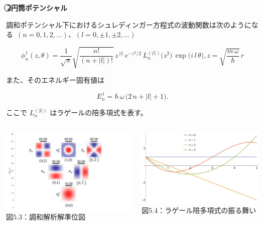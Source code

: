\documentclass{beamer}
\begin{document}
  \begin{frame}{}
    \textbf{\,\textcircled{2}\quad 円筒ポテンシャル}    

        調和ポテンシャル下におけるシュレディンガー方程式の波動関数は次のようになる\ $(n = 0,1,2,\dots)$、$(l = 0,\pm1,\pm2,\dots)$
        
        \begin{equation*}
        \phi_{n}^{\,l}(z,\theta)
        = \frac{1}{\sqrt{\pi}}
        \sqrt{\frac{n!}{(n + |l|)!}}\,
        z^{\,|l|}\,e^{-z^2/2}\,
        L_{n}^{(|l|)}\bigl(z^2\bigr)\,
        \exp\bigl(i\,l\,\theta\bigr),
        z = \sqrt{\frac{m\,\omega}{\hbar}}\,r
        \end{equation*}
        
        また、そのエネルギー固有値は
        
        \begin{equation*}
        E_{n}^{\,l} = \hbar\,\omega\,\bigl(2\,n + |l| + 1\bigr).
        \end{equation*}
        
        ここで $L_{n}^{(|l|)}$ はラゲールの陪多項式を表す。
        
        \begin{columns}
        \begin{center}
          \includegraphics[width=0.63\linewidth]{images/調和準位図.png} \\
          図5.3：調和解析解準位図
        \end{center}
        
        \begin{center}
          \includegraphics[width=0.65\linewidth]{images/ラゲール.png} \\
          図5.4：ラゲール陪多項式の振る舞い
        \end{center}
        \end{columns}
  
  \end{frame}
\end{document}
